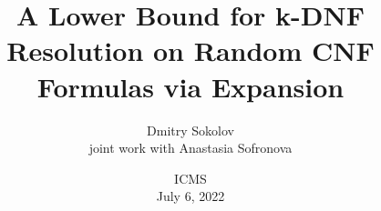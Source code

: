 

\titlegraphic{
    
}


\title[]{
    A Lower Bound for k-DNF Resolution on Random CNF Formulas via Expansion
}

\author{
    Dmitry Sokolov \\
    joint work with Anastasia Sofronova
}  


\date{ICMS\\ July 6, 2022}






    \maketitle

    
    
    

